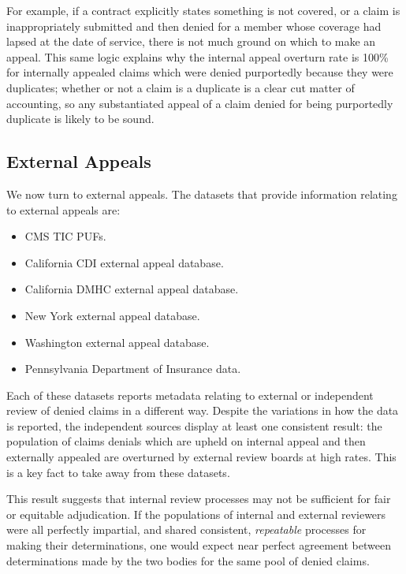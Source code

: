 \documentclass[12pt, a4paper,twoside]{report}
\theoremstyle{plain} %
\theoremstyle{definition} %
\theoremstyle{remark} %
\numberwithin{equation}{chapter}
\begin{document}
		
		For example, if a contract explicitly states something is not covered, or a claim is inappropriately submitted and then denied for a member whose coverage had lapsed at the date of service, there is not much ground on which to make an appeal. This same logic explains why the internal appeal overturn rate is 100\% for internally appealed claims which were denied purportedly because they were duplicates; whether or not a claim is a duplicate is a clear cut matter of accounting, so any substantiated appeal of a claim denied for being purportedly duplicate is likely to be sound.
		
		\subsection{External Appeals}\label{publicdata:externalappeals}
		
		We now turn to external appeals. The datasets that provide information relating to external appeals are:
		
		\begin{itemize}
			\item CMS TIC PUFs.
			\item California CDI external appeal database.
			\item California DMHC external appeal database.
			\item New York external appeal database.
			\item Washington external appeal database.
			\item Pennsylvania Department of Insurance data.
		\end{itemize}
	
		Each of these datasets reports metadata relating to external or independent review of denied claims in a different way. Despite the variations in how the data is reported, the independent sources display at least one consistent result: the population of claims denials which are upheld on internal appeal and then externally appealed are overturned by external review boards at high rates. This is a key fact to take away from these datasets.
		
		
		This result suggests that internal review processes may not be sufficient for fair or equitable adjudication. If the populations of internal and external reviewers were all perfectly impartial, and shared consistent, \emph{repeatable} processes for making their determinations, one would expect near perfect agreement between determinations made by the two bodies for the same pool of denied claims.
		
\end{document}
